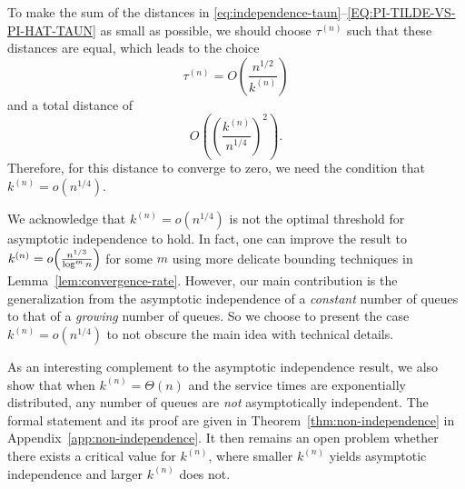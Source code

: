 \documentclass[sigconf]{acmart}
\newcommand{\supn}{^{(n)}}
\begin{document}
To make the sum of the distances in \eqref{eq:independence-taun}--\eqref{EQ:PI-TILDE-VS-PI-HAT-TAUN} as small as possible, we should choose $\tau\supn$ such that these distances are equal, which leads to the choice
\begin{equation*}
\tau\supn=O\left(\frac{n^{1/2}}{k\supn}\right)
\end{equation*}
and a total distance of
\begin{equation*}
O\left(\left(\frac{k\supn}{n^{1/4}}\right)^2\right).
\end{equation*}
Therefore, for this distance to converge to zero, we need the condition that $k\supn=o(n^{1/4})$.

We acknowledge that $k\supn = o(n^{1/4})$ is not the optimal threshold for asymptotic independence to hold. In fact, one can improve the result to $k\supn= o\Bigl(\frac{n^{1/3}}{\log^m n}\Bigr)$ for some $m$ using more delicate bounding techniques in Lemma~\ref{lem:convergence-rate}. 
However, our main contribution is the generalization from the asymptotic independence of a \emph{constant} number of queues to that of a \emph{growing} number of queues.  So we choose to present the case $k\supn = o(n^{1/4})$ to not obscure the main idea with technical details.

As an interesting complement to the asymptotic independence result, we also show that when $k\supn=\Theta(n)$ and the service times are exponentially distributed, any number of queues are \emph{not} asymptotically independent. The formal statement and its proof are given in Theorem~\ref{thm:non-independence} in Appendix~\ref{app:non-independence}.  It then remains an open problem whether there exists a critical value for $k\supn$, where smaller $k\supn$ yields asymptotic independence and larger $k\supn$ does not.


\end{document}
